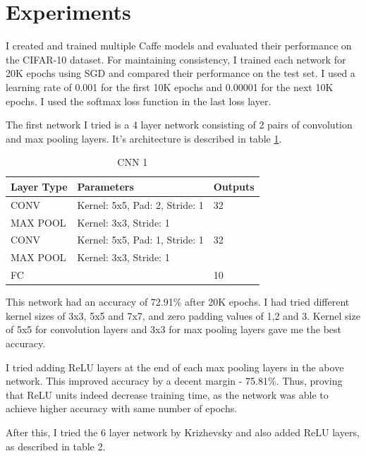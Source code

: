 \documentclass[10pt,twocolumn,letterpaper]{article}
\begin{document}
\section{Experiments}

I created and trained multiple Caffe models and evaluated their performance on the CIFAR-10 dataset. For maintaining consistency, I trained each network for 20K epochs using SGD and compared their performance on the test set. I used a learning rate of 0.001 for the first 10K epochs and 0.00001 for the next 10K epochs. I used the softmax loss function in the last loss layer.

The first network I tried is a 4 layer network consisting of 2 pairs of convolution and max pooling layers. It's architecture is described in table \ref{net1}.

\begin{table}[h]

\begin{tabular}{|l|l|l|}
\hline
Layer Type & Parameters                     & Outputs \\ \hline
CONV       & Kernel: 5x5, Pad: 2, Stride: 1 & 32      \\ \hline
MAX POOL   & Kernel: 3x3, Stride: 1         &         \\ \hline
CONV       & Kernel: 5x5, Pad: 1, Stride: 1 & 32      \\ \hline
MAX POOL   & Kernel: 3x3, Stride: 1         &         \\ \hline
FC         &                                & 10      \\ \hline
\end{tabular}
\label{net1}
\caption{CNN 1}
\end{table}

This network had an accuracy of 72.91\% after 20K epochs. I had tried different kernel sizes of 3x3, 5x5 and 7x7, and zero padding values of 1,2 and 3. Kernel size of 5x5 for convolution layers and 3x3 for max pooling layers gave me the best accuracy.

I tried adding ReLU layers at the end of each max pooling layers in the above network. This improved accuracy by a decent margin - 75.81\%. Thus, proving that ReLU units indeed decrease training time, as the network was able to achieve higher accuracy with same number of epochs.

After this, I tried the 6 layer network by Krizhevsky and also added ReLU layers, as described in table 2.
\end{document}
